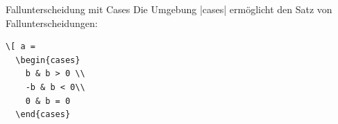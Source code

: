 \documentclass[
	vorläufig=false, 
	blattnr=2,
	ausgabe=2016-11-04,
	abgabe=2016-11-11,
	shortverb,
]{../tex/latexkurs-exercise}
\begin{document}

\begin{aufgabe}[3]{Fallunterscheidung mit Cases}
	Die Umgebung |cases| ermöglicht den Satz von Fallunterscheidungen:                                                                                                                                                                                                                                                     	\begin{lstlisting}                                                                                                                                                                                                                                                                                                             
\[ a =                                                                                                                                                                                                                                                                                                                         
  \begin{cases}                                                                                                                                                                                                                                                                                                                
    b & b > 0 \\                                                                                                                                                                                                                                                                                                         
    -b & b < 0\\                                                                                                                                                                                                                                                                                                               
    0 & b = 0                                                                                                                                                                                                                                                                                                                  
  \end{cases}                                                                                                                                                                                                                                                                                                                  

\end{lstlisting}
\end{aufgabe}
\end{document}
